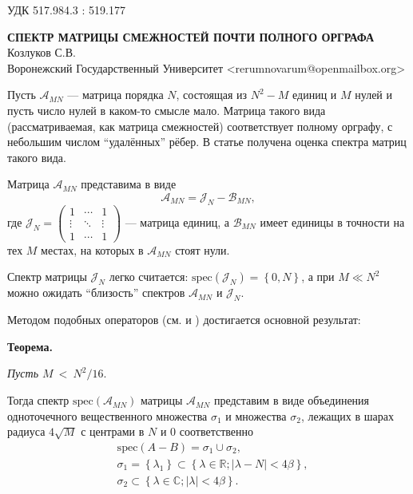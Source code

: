 \documentclass[11pt]{article}
\begin{document}
\small{УДК 517.984.3 : 519.177}

\begin{center}
\textbf{СПЕКТР МАТРИЦЫ СМЕЖНОСТЕЙ ПОЧТИ ПОЛНОГО ОРГРАФА}\\
\small{Козлуков С.В.} \\
\small{Воронежский Государственный Университет}
\small{<rerumnovarum@openmailbox.org>} \\
\end{center}

Пусть \( \mathscr{A}_{MN} \) --- матрица порядка \( N \),
состоящая из \( N^2 - M \) единиц и \( M \) нулей
и пусть число нулей в каком-то смысле мало.
Матрица такого вида (рассматриваемая, как матрица смежностей) соответствует
полному орграфу, с небольшим числом ``удалённых'' рёбер.
В статье получена оценка спектра
матриц такого вида.

Матрица \( \mathscr{A}_{MN} \) представима в виде
\[
    \mathscr{A}_{MN} = \mathscr{J}_{N} - \mathscr{B}_{MN},
    \]
где \(
\mathscr{J}_{N} =
\begin{pmatrix}1 & \cdots & 1 \\
\vdots & \ddots & \vdots \\
1 & \cdots & 1
\end{pmatrix} \) --- матрица единиц,
а \( \mathscr{B}_{MN} \) имеет единицы в точности на тех \( M \)
местах, на которых в \( \mathscr{A}_{MN} \) стоят нули.

Спектр матрицы \( \mathscr{J}_{N} \) легко считается:
\( \mathrm{spec}\left({\mathscr{J}_{N}}\right) = \left\{0, N \right\} \),
а при \( M \ll N^2 \) можно ожидать ``близость'' спектров
\( \mathscr{A}_{MN} \) и \( \mathscr{J}_{N} \).

Методом подобных операторов (см. \cite{baskakov-harmonic} и \cite{baskakov-split})
достигается основной результат:

\textbf{Теорема.}

{\it
Пусть
\(M~<~\displaystyle{N^2/16}. \)

Тогда спектр \( \mathrm{spec}\left({\mathscr{A}_{MN}}\right) \)
матрицы \( \mathscr{A}_{MN} \)
представим в виде объединения
одноточечного вещественного множества \( \sigma_1 \)
и множества \( \sigma_2 \),
лежащих в шарах радиуса \( 4\sqrt{M} \)
с центрами в \( N \) и \( 0 \) соответственно
\begin{equation*}\begin{aligned}
    & \mathrm{spec}\left({A-B}\right) = \sigma_1 \cup \sigma_2, \\
    & \sigma_1 = \left\{ \lambda_1 \right\}
      \subset \left\{ \lambda\in\mathbb{R}; \lvert \lambda - N\rvert < 4\beta \right\}, \\
    & \sigma_2 \subset \left\{\lambda\in\mathbb{C}; \lvert\lambda\rvert <4\beta \right\}. \\
\end{aligned}\end{equation*}
}
\end{document}
